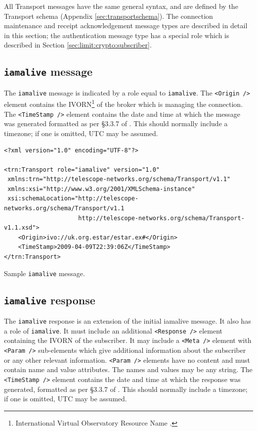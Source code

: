 \documentclass[a4paper,11pt]{ivoa}
\begin{document}
All Transport messages have the same general syntax, and are defined by the
Transport schema (Appendix \ref{sec:transportschema}). The connection
maintenance and receipt acknowledgement message types are described in detail
in this section; the authentication message type has a special role which is
described in Section \ref{sec:limit:crypto:subscriber}.

\subsection{\texttt{iamalive} message}
\label{sec:transport:iamalive}

The \texttt{iamalive} message is indicated by a role equal to
\texttt{iamalive}. The \texttt{<Origin~/>} element contains the
IVORN\footnote{International Virtual Observatory Resource Name
\citep{Plante:2007}.} of the broker which is managing the connection. The
\texttt{<TimeStamp~/>} element contains the date and time at which the message
was generated formatted as per \S3.3.7 of \citet{Peterson:2012}. This should
normally include a timezone; if one is omitted, UTC may be assumed.

\begin{listing*}
\begin{verbatim}
<?xml version="1.0" encoding="UTF-8"?>

<trn:Transport role="iamalive" version="1.0"
 xmlns:trn="http://telescope-networks.org/schema/Transport/v1.1"
 xmlns:xsi="http://www.w3.org/2001/XMLSchema-instance"
 xsi:schemaLocation="http://telescope-networks.org/schema/Transport/v1.1
                     http://telescope-networks.org/schema/Transport-v1.1.xsd">
    <Origin>ivo://uk.org.estar/estar.ex#</Origin>
    <TimeStamp>2009-04-09T22:39:06Z</TimeStamp>
</trn:Transport>
\end{verbatim}
\caption{Sample \texttt{iamalive} message.}
\label{lst:iamalive}
\end{listing*}

\subsection{\texttt{iamalive} response}
\label{sec:transport:iamaliveresponse}

The \texttt{iamalive} response is an extension of the initial iamalive
message. It also has a role of \texttt{iamalive}. It must include an
additional \texttt{<Response~/>} element containing the IVORN of the
subscriber.  It may include a \texttt{<Meta~/>} element with
\texttt{<Param~/>} sub-elements which give additional information about the
subscriber or any other relevant information. \texttt{<Param~/>} elements have
no content and must contain name and value attributes. The names and values
may be any string. The \texttt{<TimeStamp~/>} element contains the date and
time at which the response was generated, formatted as per \S3.3.7 of
\citet{Peterson:2012}. This should normally include a timezone; if one is
omitted, UTC may be assumed.
\end{document}
